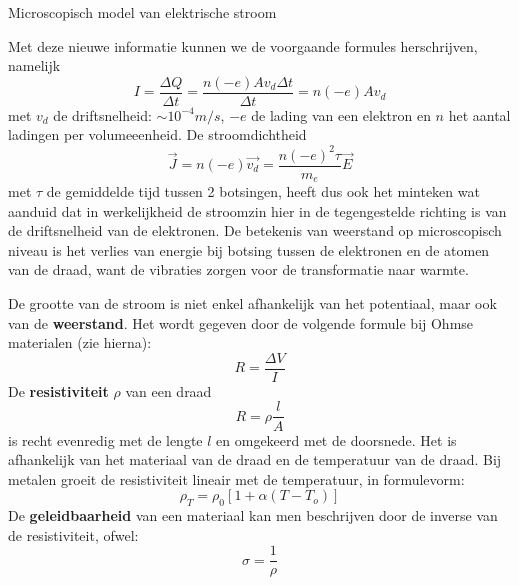 \begin{app}{Microscopisch model van elektrische stroom}
\begin{center}
    \end{center}
    Met deze nieuwe informatie kunnen we de voorgaande formules herschrijven, namelijk
    \begin{equation*}
        I = \dfrac{\Delta Q}{\Delta t} = \dfrac{n(-e)Av_d\Delta t}{\Delta t} = n(-e)Av_d
    \end{equation*}
    met $v_d$ de driftsnelheid: $\sim 10^{-4} m/s$, $-e$ de lading van een elektron en $n$ het aantal ladingen per volumeeenheid. De stroomdichtheid
    \begin{equation*}
        \Vec{J} = n(-e)\Vec{v_d} = \dfrac{n(-e)^2\tau}{m_e}\Vec{E}
    \end{equation*}
    met $\tau$ de gemiddelde tijd tussen 2 botsingen, heeft dus ook het minteken wat aanduid dat in werkelijkheid de stroomzin hier in de tegengestelde richting is van de driftsnelheid van de elektronen. De betekenis van weerstand op microscopisch niveau is het verlies van energie bij botsing tussen de elektronen en de atomen van de draad, want de vibraties zorgen voor de transformatie naar warmte.
\end{app}

\begin{theo}{}
    De grootte van de stroom is niet enkel afhankelijk van het potentiaal, maar ook van de \textbf{weerstand}. Het wordt gegeven door de volgende formule bij Ohmse materialen (zie hierna):
    \begin{equation*}
        R = \dfrac{\Delta V}{I} 
    \end{equation*}
    De \textbf{resistiviteit} $\rho$ van een draad 
    \begin{equation*}
        R = \rho \dfrac{l}{A}
    \end{equation*}
    is recht evenredig met de lengte $l$ en omgekeerd met de doorsnede. Het is afhankelijk van het materiaal van de draad en de temperatuur van de draad. Bij metalen groeit de resistiviteit lineair met de temperatuur, in formulevorm:
    \begin{equation*}
        \rho_T = \rho_0[1+\alpha(T-T_o)]
    \end{equation*}
    De \textbf{geleidbaarheid} van een materiaal kan men beschrijven door de inverse van de resistiviteit, ofwel:
    \begin{equation*}
        \sigma = \dfrac{1}{\rho}
    \end{equation*}
    \vspace{-0.5cm}
\end{theo}

